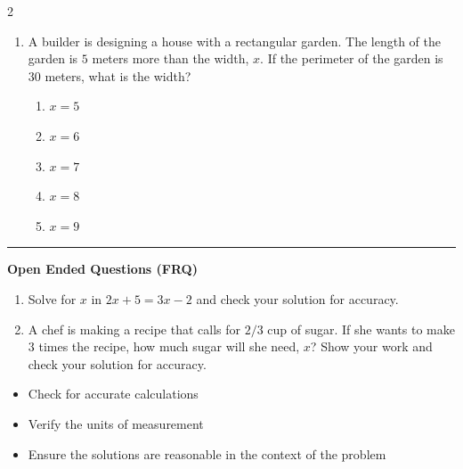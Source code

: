 \documentclass[10pt]{article}
\begin{document}
\begin{multicols}{2}
\begin{enumerate}[label=\textbf{Q\arabic*.}, leftmargin=*, itemsep=6pt, parsep=0pt]
  \item \small A builder is designing a house with a rectangular garden. The length of the garden is $5$ meters more than the width, $x$. If the perimeter of the garden is $30$ meters, what is the width?
  \begin{enumerate}[label=(\Alph*), leftmargin=0.6cm, nosep, itemsep=2pt]
    \item $x = 5$
    \item $x = 6$
    \item $x = 7$
    \item $x = 8$
    \item $x = 9$
  \end{enumerate}

\end{enumerate}
\end{multicols}

\vspace{-0.2cm}
\hrule
\vspace{0.2cm}
\textbf{\small Open Ended Questions (FRQ)}
\begin{enumerate}[label=\textbf{Q\arabic*.}, start=9, itemsep=5pt, topsep=0pt]

  \item \small Solve for $x$ in $2x + 5 = 3x - 2$ and check your solution for accuracy. \vspace{2cm}

  \item \small A chef is making a recipe that calls for $2/3$ cup of sugar. If she wants to make $3$ times the recipe, how much sugar will she need, $x$? Show your work and check your solution for accuracy. \vspace{2cm}

\end{enumerate}

\vfill

\begin{tcolorbox}[colback=blue!5, colframe=mainblue!50, title=\small \textbf{Chef's Tips}, fonttitle=\bfseries, bottom=1mm]
\begin{itemize}[noitemsep, topsep=2pt, leftmargin=0.5cm]
  \item \scriptsize Check for accurate calculations\item \scriptsize Verify the units of measurement\item \scriptsize Ensure the solutions are reasonable in the context of the problem
\end{itemize}
\end{tcolorbox}
\end{document}
